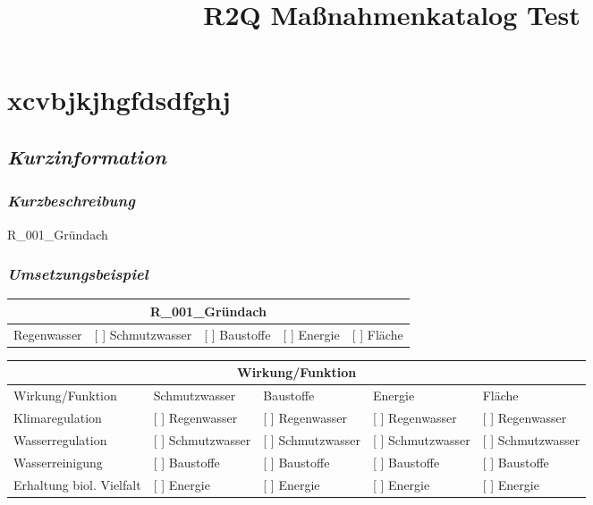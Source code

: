 \documentclass[
]{article}
\title{R2Q Maßnahmenkatalog Test}
\author{}
\date{\vspace{-2.5em}}
\begin{document}
\maketitle

\hypertarget{xcvbjkjhgfdsdfghj}{%
\section{xcvbjkjhgfdsdfghj}\label{xcvbjkjhgfdsdfghj}}

\hypertarget{kurzinformation}{%
\subsection{\texorpdfstring{\emph{Kurzinformation}}{Kurzinformation}}\label{kurzinformation}}

\hypertarget{kurzbeschreibung}{%
\subsubsection{\texorpdfstring{\emph{Kurzbeschreibung}}{Kurzbeschreibung}}\label{kurzbeschreibung}}

R\_001\_Gründach

\hypertarget{umsetzungsbeispiel}{%
\subsubsection{\texorpdfstring{\emph{Umsetzungsbeispiel}}{Umsetzungsbeispiel}}\label{umsetzungsbeispiel}}

\begin{center}
\begin{tabularx}{\textwidth}{|X|X|X|X|X|}
\hline
\multicolumn{5}{|c|}{\textbf{R\_001\_Gründach}} \tabularnewline
\hline
[ ] Regenwasser & [ ] Schmutzwasser & [ ] Baustoffe & [ ] Energie & [ ] Fläche \\
\hline
\end{tabularx}
\end{center}

\begin{center}
\begin{tabular}{|l|l|l|l|l|}
\hline
\multicolumn{5}{|c|}{\textbf{Wirkung/Funktion}} \tabularnewline
\hline
Wirkung/Funktion & Schmutzwasser & Baustoffe & Energie & Fläche \\
\hline
[ ] Klimaregulation & [ ] Regenwasser & [ ] Regenwasser & [ ] Regenwasser & [ ] Regenwasser \\
\hline
[ ] Wasserregulation & [ ] Schmutzwasser & [ ] Schmutzwasser & [ ] Schmutzwasser & [ ] Schmutzwasser \\
\hline
[ ] Wasserreinigung & [ ] Baustoffe & [ ] Baustoffe & [ ] Baustoffe & [ ] Baustoffe \\
\hline
[ ] Erhaltung biol. Vielfalt & [ ] Energie & [ ] Energie & [ ] Energie & [ ] Energie \\
\hline
\end{tabular}
\end{center}
\end{document}
